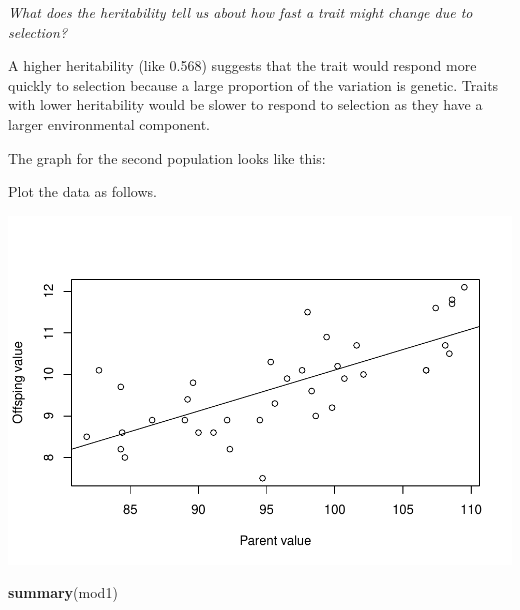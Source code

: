 \documentclass[
  a4paper]{book}
\newenvironment{Shaded}{\begin{snugshade}}{\end{snugshade}}
\newcommand{\AttributeTok}[1]{\textcolor[rgb]{0.13,0.29,0.53}{#1}}
\newcommand{\CommentTok}[1]{\textcolor[rgb]{0.56,0.35,0.01}{\textit{#1}}}
\newcommand{\FunctionTok}[1]{\textcolor[rgb]{0.13,0.29,0.53}{\textbf{#1}}}
\newcommand{\NormalTok}[1]{#1}
\newcommand{\OtherTok}[1]{\textcolor[rgb]{0.56,0.35,0.01}{#1}}
\newcommand{\SpecialCharTok}[1]{\textcolor[rgb]{0.81,0.36,0.00}{\textbf{#1}}}
\newcommand{\StringTok}[1]{\textcolor[rgb]{0.31,0.60,0.02}{#1}}
\begin{document}
\emph{What does the heritability tell us about how fast a trait might change due to selection?}

A higher heritability (like 0.568) suggests that the trait would respond more quickly to selection because a large proportion of the variation is genetic. Traits with lower heritability would be slower to respond to selection as they have a larger environmental component.

The graph for the second population looks like this:

Plot the data as follows.

\begin{Shaded}
\end{Shaded}

\includegraphics{BB512_files/figure-latex/plotparentoffspring-1.pdf}

\begin{Shaded}
\begin{Highlighting}[]
\FunctionTok{summary}\NormalTok{(mod1)}
\end{Highlighting}
\end{Shaded}
\end{document}
